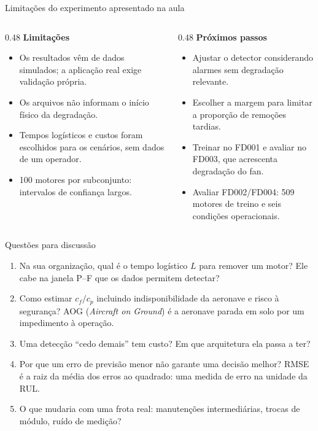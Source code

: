 \documentclass[aspectratio=169,10pt]{beamer}
\begin{document}
\begin{frame}{Limitações do experimento apresentado na aula}
  \begin{columns}[T]
    \begin{column}{0.48\textwidth}
      \textbf{Limitações}
      \begin{itemize}
        \item Os resultados vêm de dados simulados; a aplicação real exige validação própria.
        \item Os arquivos não informam o início físico da degradação.
        \item Tempos logísticos e custos foram escolhidos para os cenários, sem dados de um operador.
        \item 100 motores por subconjunto: intervalos de confiança largos.
      \end{itemize}
    \end{column}
    \begin{column}{0.48\textwidth}
      \textbf{Próximos passos}
      \begin{itemize}
        \item Ajustar o detector considerando alarmes sem degradação relevante.
        \item Escolher a margem para limitar a proporção de remoções tardias.
        \item Treinar no FD001 e avaliar no FD003, que acrescenta degradação do fan.
        \item Avaliar FD002/FD004: 509 motores de treino e seis condições operacionais.
      \end{itemize}
    \end{column}
  \end{columns}
\end{frame}

\begin{frame}{Questões para discussão}
  \begin{enumerate}
    \item Na sua organização, qual é o tempo logístico $L$ para remover um motor? Ele cabe na janela P--F que os dados permitem detectar?
    \item Como estimar $c_f/c_p$ incluindo indisponibilidade da aeronave e risco à segurança? AOG (\emph{Aircraft on Ground}) é a aeronave parada em solo por um impedimento à operação.
    \item Uma detecção ``cedo demais'' tem custo? Em que arquitetura ela passa a ter?
    \item Por que um erro de previsão menor não garante uma decisão melhor? RMSE é a raiz da média dos erros ao quadrado: uma medida de erro na unidade da RUL.
    \item O que mudaria com uma frota real: manutenções intermediárias, trocas de módulo, ruído de medição?
  \end{enumerate}
\end{frame}
\end{document}
